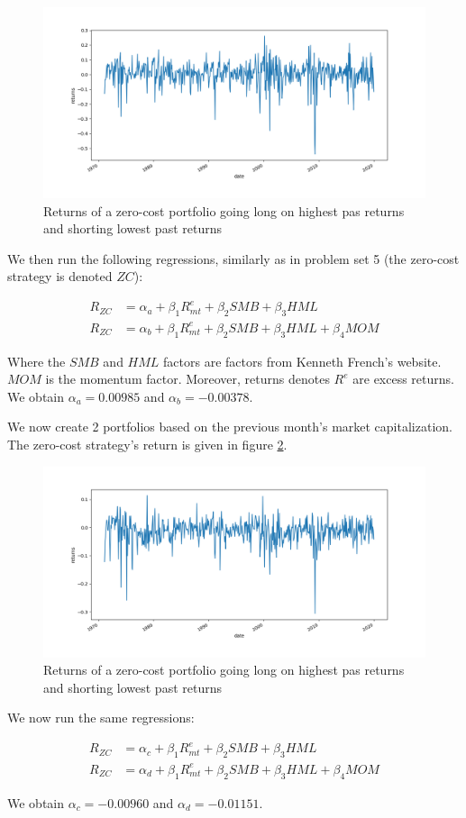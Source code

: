 \documentclass[10pt]{article}
\begin{document}
\begin{figure}[h]
    \centering
    \includegraphics[scale=0.5]{ps8_ex2_plot1.png}
    \caption{Returns of a zero-cost portfolio going  long on highest pas returns and shorting lowest past returns}
    \label{ps8_ex2_plot1}    
\end{figure}

We then run the following regressions, similarly as in problem set 5 (the zero-cost strategy is denoted $ZC$):

\begin{align*}	
	R_{ZC} &= \alpha_a +  \beta_1 R^e_{mt} + \beta_2 SMB + \beta_3 HML \\
	R_{ZC}  &= \alpha_b + \beta_1 R^e_{mt} + \beta_2 SMB + \beta_3 HML + \beta_4 MOM
\end{align*}  

Where the $SMB$ and $HML$ factors are factors from Kenneth French’s website. $MOM$ is the momentum factor. Moreover, returns denotes $R^e$ are excess returns. We obtain $\alpha_{a} = 0.00985$ and $\alpha_{b} = -0.00378$.   
   
\bigbreak

We now create 2 portfolios based on the previous month's market capitalization.  The zero-cost strategy's return is given in figure \ref{ps8_ex2_plot2}.

\begin{figure}[h]
    \centering
    \includegraphics[scale=0.5]{ps8_ex2_plot2.png}
    \caption{Returns of a zero-cost portfolio going  long on highest pas returns and shorting lowest past returns}
    \label{ps8_ex2_plot2}    
\end{figure}

We now run the same regressions:

\begin{align*}	
	R_{ZC} &= \alpha_c +  \beta_1 R^e_{mt}  + \beta_2 SMB + \beta_3 HML \\
	R_{ZC}  &= \alpha_d + \beta_1 R^e_{mt} + \beta_2 SMB + \beta_3 HML + \beta_4 MOM
\end{align*}  

We obtain $\alpha_{c} =  -0.00960$ and $\alpha_{d} = -0.01151$.
   
\end{document}
